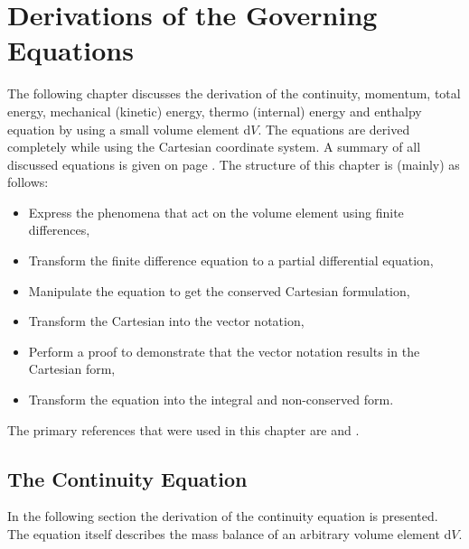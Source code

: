 \documentclass[MathematicsNumericsDerivationsAndOpenFOAM.tex]{subfiles}
\begin{document}
%
%
\chapter{Derivations of the Governing Equations}
%
%
%
      The following chapter discusses the derivation of the continuity,
      momentum, total energy,  mechanical (kinetic) energy, thermo (internal)
      energy and enthalpy equation by using a small volume element d$V$. The
      equations are derived completely while using the Cartesian coordinate
      system. A summary of all discussed equations is given on page
      \pageref{SummationOfEquations}. The structure of this chapter is (mainly)
      as follows:
%
%
\begin{itemize}
 \item Express the phenomena that act on the volume element using finite differences,
 \item Transform the finite difference equation to a partial differential equation,
 \item Manipulate the equation to get the conserved Cartesian formulation,
 \item Transform the Cartesian into the vector notation,
 \item Perform a proof to demonstrate that the vector notation results in the Cartesian form,
 \item Transform the equation into the integral and non-conserved form.
\end{itemize}
%
%

	The primary references that were used in this chapter are
    \cite{  Bird, Versteeg, JasakPhD, Ferziger, Rappaz,  Schwarze, ProgrammersGuide}
    and \cite{Moukalled15}.
%
%
%
%
%
\section{The Continuity Equation}
%
%
	In the following section the derivation of the continuity equation is
    presented. The equation itself describes the mass balance of an arbitrary
    volume element d$V$.
\end{document}

